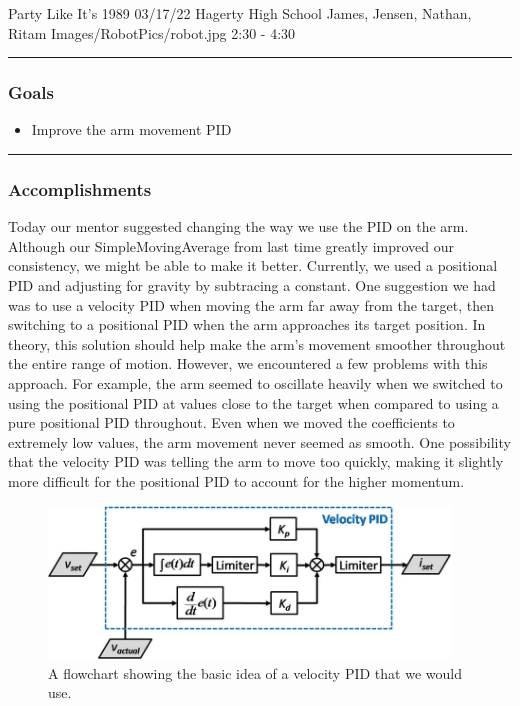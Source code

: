 \insertmeeting 
	{Party Like It's 1989} 
	{03/17/22} 
	{Hagerty High School}
	{James, Jensen, Nathan, Ritam}
	{Images/RobotPics/robot.jpg}
	{2:30 - 4:30}
	
\noindent\hfil\rule{\textwidth}{.4pt}\hfil
\subsubsection*{Goals}
\begin{itemize}
    \item Improve the arm movement PID 

\end{itemize} 

\noindent\hfil\rule{\textwidth}{.4pt}\hfil

\subsubsection*{Accomplishments}
Today our mentor suggested changing the way we use the PID on the arm. Although our SimpleMovingAverage from last time greatly improved our consistency, we might be able to make it better. Currently, we used a positional PID and adjusting for gravity by subtracing a constant. One suggestion we had was to use a velocity PID when moving the arm far away from the target, then switching to a positional PID when the arm approaches its target position. In theory, this solution should help make the arm's movement smoother throughout the entire range of motion. However, we encountered a few problems with this approach. For example, the arm seemed to oscillate heavily when we switched to using the positional PID at values close to the target when compared to using a pure positional PID throughout. Even when we moved the coefficients to extremely low values, the arm movement never seemed as smooth. One possibility that the velocity PID was telling the arm to move too quickly, making it slightly more difficult for the positional PID to account for the higher momentum. 


\begin{figure}[htp]
\centering
\includegraphics[width=0.95\textwidth, angle=0]{Meetings/March/03-17-22/03-17-22 1.png}
\caption{A flowchart showing the basic idea of a velocity PID that we would use.}
\label{fig:031722_1}
\end{figure}




